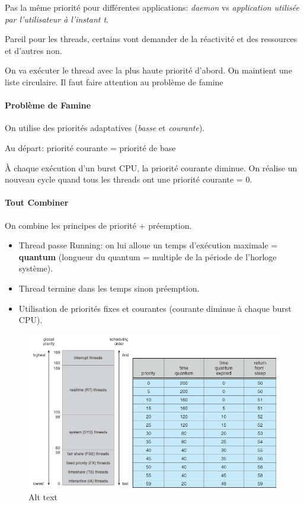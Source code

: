 Pas la même priorité pour différentes applications: \emph{daemon} vs
\emph{application utilisée par l'utilisateur à l'instant t}.

Pareil pour les threads, certains vont demander de la réactivité et des
ressources et d'autres non.

On va exécuter le thread avec la plus haute priorité d'abord. On
maintient une liste circulaire. Il faut faire attention au problème de
famine

\paragraph{Problème de Famine}\label{probluxe8me-de-famine}

On utilise des priorités adaptatives (\emph{basse} et \emph{courante}).

Au départ: priorité courante = priorité de base

À chaque exécution d'un burst CPU, la priorité courante diminue. On
réalise un nouveau cycle quand tous les threads ont une priorité
courante = 0.

\paragraph{Tout Combiner}\label{tout-combiner}

On combine les principes de priorité + préemption.

\begin{itemize}
\tightlist
\item
  Thread passe Running: on lui alloue un temps d'exécution maximale =
  \textbf{quantum} (longueur du quantum = multiple de la période de
  l'horloge système).
\item
  Thread termine dans les temps sinon préemption.
\item
  Utilisation de priorités fixes et courantes (courante diminue à chaque
  burst CPU).
\end{itemize}

\begin{figure}
\centering
\includegraphics{image-33.png}
\caption{Alt text}
\end{figure}

